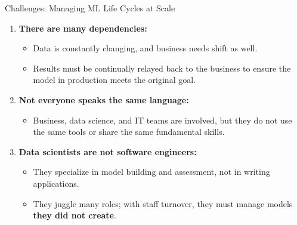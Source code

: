 \begin{frame}{Challenges: Managing ML Life Cycles at Scale}
\begin{enumerate}
\item<1-> \textbf{There are many dependencies:}
    \begin{itemize}
    \item Data is constantly changing, and business needs shift as well.
    \item Results must be continually relayed back to the business to ensure the model in production meets the original goal.
    \end{itemize}
\item<2-> \textbf{Not everyone speaks the same language:}
    \begin{itemize}
    \item Business, data science, and IT teams are involved, but they do not use the same tools or share the same fundamental skills.
    \end{itemize}
\item<3-> \textbf{Data scientists are not software engineers:}
    \begin{itemize}
    \item They specialize in model building and assessment, not in writing applications.
    \item They juggle many roles; with staff turnover, they must manage models \textbf{they did not create}.
    \end{itemize}
\end{enumerate}
\end{frame}

